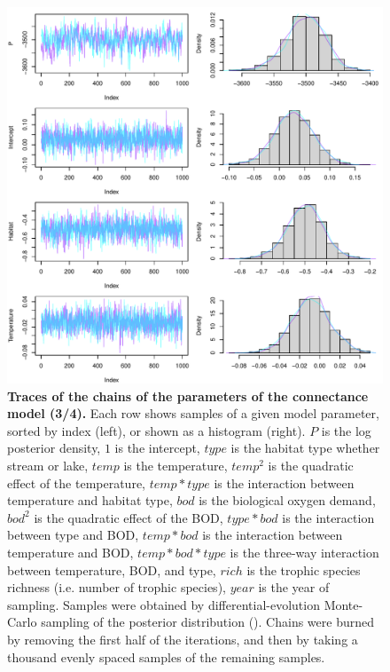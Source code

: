 \documentclass[11pt, oneside]{article}
\begin{document}
\begin{figure}[H]
\begin{center}
\includegraphics[page=3, width=1\linewidth]{b0_6_3/out_con/fig_tracePlot_beta.pdf}
\caption{
    \textbf{Traces of the chains of the parameters of the connectance model (3/4).}
    Each row shows samples of a given model parameter, sorted by index (left), or shown as a histogram (right).
    $P$ is the log posterior density, $1$ is the intercept, $type$ is the habitat type whether stream or lake, $temp$ is the temperature, $temp^2$ is the quadratic effect of the temperature, $temp * type$ is the interaction between temperature and habitat type, $bod$ is the biological oxygen demand, $bod^2$ is the quadratic effect of the BOD, $type * bod$ is the interaction between type and BOD, $temp * bod$ is the interaction between temperature and BOD, $temp * bod * type$ is the three-way interaction between temperature, BOD, and type, $rich$ is the trophic species richness (i.e. number of trophic species), $year$ is the year of sampling.
    Samples were obtained by differential-evolution Monte-Carlo sampling of the posterior distribution (\cite{TerBraak2006}).
    Chains were burned by removing the first half of the iterations, and then by taking a thousand evenly spaced samples of the remaining samples.
}
\end{center}
\end{figure}
\end{document}
